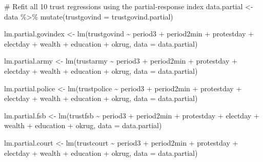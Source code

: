 \documentclass[
  letterpaper,
  DIV=11,
  numbers=noendperiod]{scrartcl}
\newenvironment{Shaded}{\begin{snugshade}}{\end{snugshade}}
\newcommand{\AttributeTok}[1]{\textcolor[rgb]{0.40,0.45,0.13}{#1}}
\newcommand{\CommentTok}[1]{\textcolor[rgb]{0.37,0.37,0.37}{#1}}
\newcommand{\FunctionTok}[1]{\textcolor[rgb]{0.28,0.35,0.67}{#1}}
\newcommand{\NormalTok}[1]{\textcolor[rgb]{0.00,0.23,0.31}{#1}}
\newcommand{\OtherTok}[1]{\textcolor[rgb]{0.00,0.23,0.31}{#1}}
\newcommand{\SpecialCharTok}[1]{\textcolor[rgb]{0.37,0.37,0.37}{#1}}
\begin{document}
\begin{Shaded}
\begin{Highlighting}[]
\CommentTok{\# Refit all 10 trust regressions using the partial{-}response index}
\NormalTok{data.partial }\OtherTok{\textless{}{-}}\NormalTok{ data }\SpecialCharTok{\%\textgreater{}\%} 
  \FunctionTok{mutate}\NormalTok{(}\AttributeTok{trustgovind =}\NormalTok{ trustgovind.partial)}

\NormalTok{lm.partial.govindex }\OtherTok{\textless{}{-}} \FunctionTok{lm}\NormalTok{(trustgovind }\SpecialCharTok{\textasciitilde{}}\NormalTok{ period3 }\SpecialCharTok{+}\NormalTok{ period2min }\SpecialCharTok{+}\NormalTok{ protestday }\SpecialCharTok{+}\NormalTok{ electday }\SpecialCharTok{+}
\NormalTok{                            wealth }\SpecialCharTok{+}\NormalTok{ education }\SpecialCharTok{+}\NormalTok{ okrug, }\AttributeTok{data =}\NormalTok{ data.partial)}

\NormalTok{lm.partial.army }\OtherTok{\textless{}{-}} \FunctionTok{lm}\NormalTok{(trustarmy }\SpecialCharTok{\textasciitilde{}}\NormalTok{ period3 }\SpecialCharTok{+}\NormalTok{ period2min }\SpecialCharTok{+}\NormalTok{ protestday }\SpecialCharTok{+}\NormalTok{ electday }\SpecialCharTok{+}
\NormalTok{                        wealth }\SpecialCharTok{+}\NormalTok{ education }\SpecialCharTok{+}\NormalTok{ okrug, }\AttributeTok{data =}\NormalTok{ data.partial)}

\NormalTok{lm.partial.police }\OtherTok{\textless{}{-}} \FunctionTok{lm}\NormalTok{(trustpolice }\SpecialCharTok{\textasciitilde{}}\NormalTok{ period3 }\SpecialCharTok{+}\NormalTok{ period2min }\SpecialCharTok{+}\NormalTok{ protestday }\SpecialCharTok{+}\NormalTok{ electday }\SpecialCharTok{+}
\NormalTok{                          wealth }\SpecialCharTok{+}\NormalTok{ education }\SpecialCharTok{+}\NormalTok{ okrug, }\AttributeTok{data =}\NormalTok{ data.partial)}

\NormalTok{lm.partial.fsb }\OtherTok{\textless{}{-}} \FunctionTok{lm}\NormalTok{(trustfsb }\SpecialCharTok{\textasciitilde{}}\NormalTok{ period3 }\SpecialCharTok{+}\NormalTok{ period2min }\SpecialCharTok{+}\NormalTok{ protestday }\SpecialCharTok{+}\NormalTok{ electday }\SpecialCharTok{+}
\NormalTok{                       wealth }\SpecialCharTok{+}\NormalTok{ education }\SpecialCharTok{+}\NormalTok{ okrug, }\AttributeTok{data =}\NormalTok{ data.partial)}

\NormalTok{lm.partial.court }\OtherTok{\textless{}{-}} \FunctionTok{lm}\NormalTok{(trustcourt }\SpecialCharTok{\textasciitilde{}}\NormalTok{ period3 }\SpecialCharTok{+}\NormalTok{ period2min }\SpecialCharTok{+}\NormalTok{ protestday }\SpecialCharTok{+}\NormalTok{ electday }\SpecialCharTok{+}
\NormalTok{                         wealth }\SpecialCharTok{+}\NormalTok{ education }\SpecialCharTok{+}\NormalTok{ okrug, }\AttributeTok{data =}\NormalTok{ data.partial)}


\end{Highlighting}
\end{Shaded}
\end{document}
